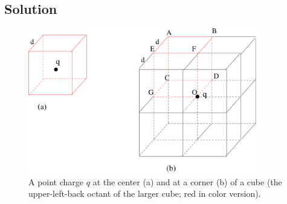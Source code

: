 \documentclass[solutions]{esg8022pset}
\begin{document}
\subsection{Solution}
  \begin{figure}[ht]
    \begin{center}
      \includegraphics[width=10cm]{ps02_sol_02}
      \caption{A point charge $q$ at the center (a) and at a corner (b) of a cube (the upper-left-back octant of the larger cube; red in color version).}
      \label{fig:cubeflux6}
    \end{center}
  \end{figure}
\end{document}

